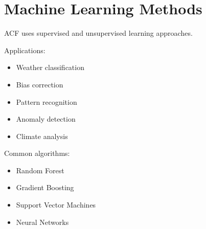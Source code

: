 \section{Machine Learning Methods}


ACF uses supervised and unsupervised learning approaches.



Applications:


\begin{itemize}

\item Weather classification

\item Bias correction

\item Pattern recognition

\item Anomaly detection

\item Climate analysis

\end{itemize}



Common algorithms:


\begin{itemize}

\item Random Forest

\item Gradient Boosting

\item Support Vector Machines

\item Neural Networks

\end{itemize}
